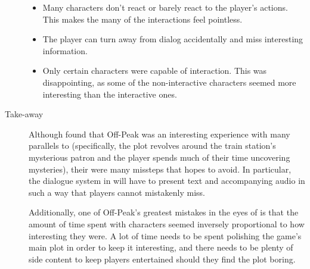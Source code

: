 \begin{description}
{\begin{itemize}
\item{Many characters don't react or barely react to the player's actions. This makes the many of the interactions feel pointless.}
\item{The player can turn away from dialog accidentally and miss interesting information.}
\item{Only certain characters were capable of interaction. This was disappointing, as some of the non-interactive characters seemed more interesting than the interactive ones.}
\end{itemize}
}
\item[Take-away]{Although \ourteam{} found that Off-Peak was an interesting experience with many parallels to \ourgame{} (specifically, the plot revolves around the train station's mysterious patron and the player spends much of their time uncovering mysteries), their were many missteps that \ourteam{} hopes to avoid. In particular, the dialogue system in \ourgame{} will have to present text and accompanying audio in such a way that players cannot mistakenly miss.

Additionally, one of Off-Peak's greatest mistakes in the eyes of \ourteam{} is that the amount of time spent with characters seemed inversely proportional to how interesting they were. A lot of time needs to be spent polishing the game's main plot in order to keep it interesting, and there needs to be plenty of side content to keep players entertained should they find the plot boring.}
\end{description}



\clearpage
